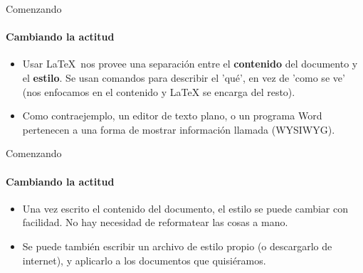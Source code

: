 
\begin{frame}[fragile]{Comenzando}
    \framesubtitle{Cambiando la actitud}
    \begin{itemize}
        \item Usar \LaTeX\ nos provee una separación entre el \textbf{contenido} del documento y el \textbf{estilo}. Se usan comandos para describir el 'qué', en vez de 'como se ve' (nos enfocamos en el contenido y \LaTeX{}  se encarga del resto).
        \item Como contraejemplo, un editor de texto plano, o un programa Word pertenecen a una forma de mostrar información llamada  (WYSIWYG).
    \end{itemize}

\end{frame}

\begin{frame}[fragile]{Comenzando}
    \framesubtitle{Cambiando la actitud}
    \begin{itemize}
        \item Una vez escrito el contenido del documento, el estilo se puede cambiar con facilidad. No hay necesidad de reformatear las cosas a mano.
        \item Se puede también escribir un archivo de estilo propio (o descargarlo de internet), y aplicarlo a los documentos que quisiéramos.
        
    \end{itemize}

\end{frame}


